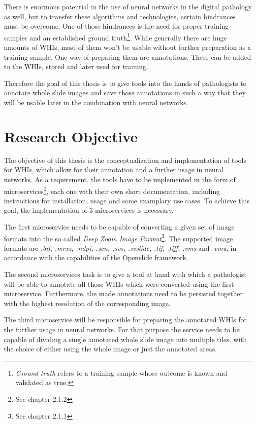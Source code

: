 There is enormous potential in the use of neural networks in the digital pathology as well, but to transfer these algorithms and technologies, certain hindrances must be overcome. One of those hindrances is the need for proper training samples and an established ground truth\footnote{\emph{Ground truth} refers to a training sample whose outcome is known and validated as true.}. While generally there are huge amounts of WHIs, most of them won't be usable without further preparation as a training sample. One way of preparing them are annotations. These can be added to the WHIs, stored and later used for training.

Therefore the goal of this thesis is to give tools into the hands of pathologists to annotate whole slide images and save those annotations in such a way that they will be usable later in the combination with neural networks.


\section{Research Objective}
The objective of this thesis is the conceptualization and implementation of tools for WHIs, which allow for their annotation and a further usage in neural networks. As a requirement, the tools have to be implemented in the form of microservices\footnote{See chapter 2.1.2}, each one with their own short documentation, including instructions for installation, usage and some examplary use cases. To achieve this goal, the implementation of 3 microservices is necessary.

The first microservice needs to be capable of converting a given set of image formats into the so called \emph{Deep Zoom Image Format}\footnote{See chapter 2.1.1}. The supported image formats are \emph{.bif, .mrxs, .ndpi, .scn, .svs, .svslide, .tif, .tiff, .vms} and \emph{.vmu}, in accordance with the capabilities of the Openslide framework\cite{Goode13}.

The second microservices task is to give a tool at hand with which a pathologist will be able to annotate all those WHIs which were converted using the first microservice. Furthermore, the made annotations need to be persisted together with the highest resolution of the corresponding image.

The third microservice will be responsible for preparing the annotated WHIs for the further usage in neural networks. For that purpose the service needs to be capable of dividing a single annotated whole slide image into multiple tiles, with the choice of either using the whole image or just the annotated areas.


